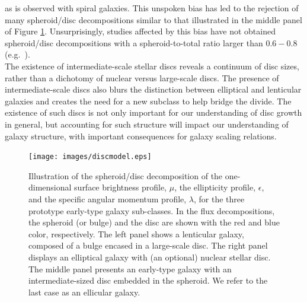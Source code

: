 \documentclass[useAMS,usenatbib,article]{mn2e}
\begin{document}
as is observed with spiral galaxies. 
This unspoken bias has led to the rejection of many spheroid/disc decompositions similar to that illustrated in the middle panel of Figure \ref{fig:model}. 
Unsurprisingly, studies affected by this bias have not obtained spheroid/disc decompositions with a spheroid-to-total ratio larger than $0.6 - 0.8$ 
(e.g.~\citealt{gadotti2008,head2014,querejeta2015,mendezabreu2015}). \\
The existence of intermediate-scale stellar discs reveals a continuum of disc sizes, 
rather than a dichotomy of nuclear versus large-scale discs. 
The presence of intermediate-scale discs also blurs the distinction between elliptical and lenticular galaxies 
and creates the need for a new subclass to help bridge the divide. 
The existence of such discs is not only important for our understanding of disc growth in general, 
but accounting for such structure will impact our understanding of galaxy structure, 
with important consequences for galaxy scaling relations. 

\begin{figure}
\begin{center}
\texttt{[image: images/discmodel.eps]}
\caption{Illustration of the spheroid/disc decomposition of the one-dimensional surface brightness profile, $\mu$, 
the ellipticity profile, $\epsilon$, and the specific angular momentum profile, $\lambda$,
for the three prototype early-type galaxy sub-classes. 
In the flux decompositions, the spheroid (or bulge) and the disc are shown with the red and blue color, respectively. 
The left panel shows a lenticular galaxy, composed of a bulge encased in a large-scale disc. 
The right panel displays an elliptical galaxy with (an optional) nuclear stellar disc. 
The middle panel presents an early-type galaxy with an intermediate-sized disc embedded in the spheroid. 
We refer to the last case as an ellicular galaxy.}
\label{fig:model}
\end{center}
\end{figure}
\end{document}
